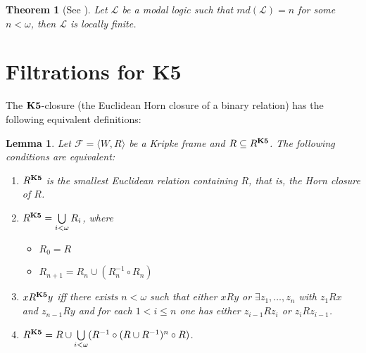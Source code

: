 \documentclass[a4paper]{article}
\theoremstyle{defin}
\theoremstyle{theorem}
\newtheorem{theorem}{Theorem}
\theoremstyle{prop}
\theoremstyle{lemma}
\newtheorem{lemma}{Lemma}
\theoremstyle{fact}
\theoremstyle{ex}
\theoremstyle{col}
\theoremstyle{claim}
\begin{document}
\begin{theorem} [See \cite{gabbay1998products}]
  Let $\mathcal{L}$ be a modal logic such that $md(\mathcal{L}) = n$ for some $n < \omega$, then $\mathcal{L}$ is locally finite.
\end{theorem}

\section{Filtrations for {\bf K5}}

The ${\bf K5}$-closure (the Euclidean Horn closure of a binary relation) has the following equivalent definitions:
\begin{lemma} \label{equivHorn}
  Let $\mathcal{F} = \langle W, R \rangle$ be a Kripke frame and $R \subseteq R^{\bf K5}$.
  The following conditions are equivalent:

  \begin{enumerate}
    \item $R^{\bf K5}$ is the smallest Euclidean relation containing $R$, that is, the Horn closure of $R$.
    \item $R^{\bf K5} = \bigcup \limits_{i < \omega} R_i$, where
    \begin{itemize}
      \item $R_0 = R$
      \item $R_{n + 1} = R_n \cup (R^{-1}_n \circ R_n)$
    \end{itemize}
    \item $x R^{\bf K5} y$ iff there exists $n < \omega$ such that
    either $x R y$ or $\exists z_1, \dots, z_n$ with $z_1 R x$ and $z_{n - 1} R y$ and for each $1 < i \leq n$ one has
    either $z_{i - 1} R z_i$ or $z_i R z_{i - 1}$.
    \item $R^{\bf K5} = R \cup \bigcup \limits_{i < \omega} (R^{-1} \circ (R \cup R^{-1})^n \circ R)$.
  \end{enumerate}
\end{lemma}
\end{document}
